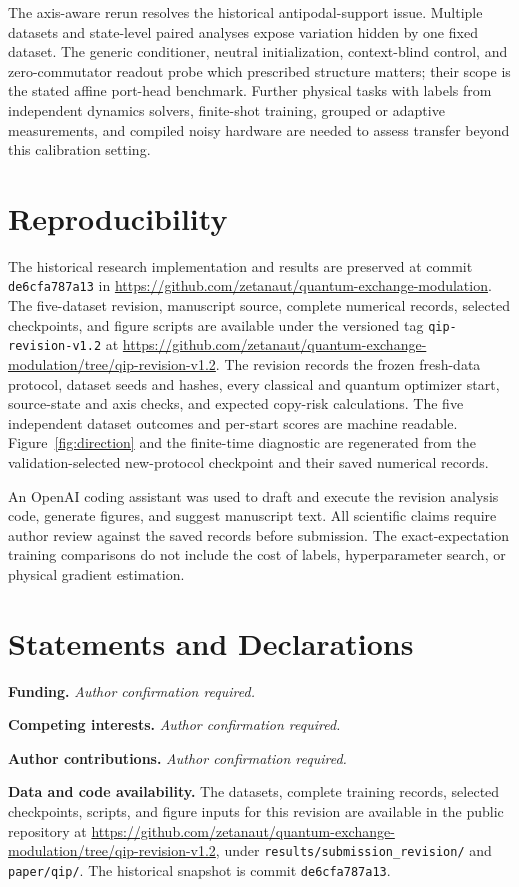 \documentclass[pdflatex,sn-mathphys-num]{sn-jnl}
\newcommand{\FundingStatement}{\textit{Author confirmation required.}}
\newcommand{\CompetingInterestStatement}{\textit{Author confirmation required.}}
\newcommand{\ContributionStatement}{\textit{Author confirmation required.}}
\begin{document}
The axis-aware rerun resolves the historical antipodal-support issue. Multiple datasets and state-level paired analyses expose variation hidden by one fixed dataset. The generic conditioner, neutral initialization, context-blind control, and zero-commutator readout probe which prescribed structure matters; their scope is the stated affine port-head benchmark. Further physical tasks with labels from independent dynamics solvers, finite-shot training, grouped or adaptive measurements, and compiled noisy hardware are needed to assess transfer beyond this calibration setting.

\section{Reproducibility}
The historical research implementation and results are preserved at commit \texttt{de6cfa787a13} in \url{https://github.com/zetanaut/quantum-exchange-modulation}. The five-dataset revision, manuscript source, complete numerical records, selected checkpoints, and figure scripts are available under the versioned tag \texttt{qip-revision-v1.2} at \url{https://github.com/zetanaut/quantum-exchange-modulation/tree/qip-revision-v1.2}. The revision records the frozen fresh-data protocol, dataset seeds and hashes, every classical and quantum optimizer start, source-state and axis checks, and expected copy-risk calculations. The five independent dataset outcomes and per-start scores are machine readable. Figure~\ref{fig:direction} and the finite-time diagnostic are regenerated from the validation-selected new-protocol checkpoint and their saved numerical records.

An OpenAI coding assistant was used to draft and execute the revision analysis code, generate figures, and suggest manuscript text. All scientific claims require author review against the saved records before submission. The exact-expectation training comparisons do not include the cost of labels, hyperparameter search, or physical gradient estimation.

\backmatter
\section*{Statements and Declarations}
\textbf{Funding.} \FundingStatement

\textbf{Competing interests.} \CompetingInterestStatement

\textbf{Author contributions.} \ContributionStatement

\textbf{Data and code availability.} The datasets, complete training records, selected checkpoints, scripts, and figure inputs for this revision are available in the public repository at \url{https://github.com/zetanaut/quantum-exchange-modulation/tree/qip-revision-v1.2}, under \texttt{results/submission_revision/} and \texttt{paper/qip/}. The historical snapshot is commit \texttt{de6cfa787a13}.
\end{document}
